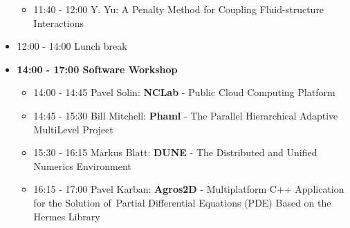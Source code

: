 \documentclass[10pt, A4]{article}%
\begin{document}
\begin{itemize}
\begin{itemize}
    \item 11:40 - 12:00 {Y. Yu}: {A Penalty Method for Coupling Fluid-structure Interactions}
  \end{itemize}
  \item 12:00 - 14:00 Lunch break
  \newpage
  \item {\bf 14:00 - 17:00 Software Workshop}
  \begin{itemize}
    \item 14:00 - 14:45 Pavel Solin: {\bf NCLab} - Public Cloud Computing Platform
    \item 14:45 - 15:30 Bill Mitchell: {\bf Phaml} - The Parallel Hierarchical Adaptive MultiLevel Project
    \item 15:30 - 16:15 Markus Blatt: {\bf DUNE} - The Distributed and Unified Numerics Environment
    \item 16:15 - 17:00 Pavel Karban: {\bf Agros2D} - Multiplatform C++ Application for the Solution of~Partial Differential Equations (PDE) Based on the Hermes Library  
  \end{itemize}
\end{itemize}
\end{document}
